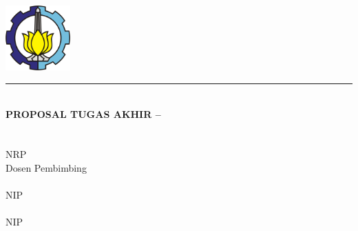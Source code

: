\begin{titlepage}


\vspace*{-1.5cm} %
\noindent
\includegraphics[width=2.5cm]{cover/logoITS.png} \\[1cm] 

\noindent\hspace*{-3cm}\textcolor{ITSBlue}{\rule{\paperwidth}{1cm}} \\[0.3cm]

\noindent
{\fontsize{14pt}{14pt}\selectfont \textbf{PROPOSAL TUGAS AKHIR – \kodeTA}} \\[2cm]

\noindent
{\fontsize{18pt}{14pt}\selectfont \textbf{\judulTA}} \\[2cm]

\noindent
{\fontsize{14pt}{14pt}\selectfont \textbf{\namaMhs} \\ NRP \nrpMhs} \\[2cm]

\noindent
{\fontsize{14pt}{14pt}\selectfont Dosen Pembimbing} \\[0.3cm]
\noindent
{\fontsize{14pt}{14pt}\selectfont \textbf{\pembimbingSatu} \\ NIP \nipPembimbingSatu} \\[0.8cm]
\noindent
{\fontsize{14pt}{14pt}\selectfont \textbf{\pembimbingDua} \\ NIP \nipPembimbingDua} \\[2cm]

\noindent
{\fontsize{12pt}{14pt}\selectfont \textbf{\prodi}} \\[0.3cm]
\noindent
{\fontsize{12pt}{14pt}\selectfont
\depart \\
\fakul \\
\kampus \\
\kota \\
\tahundibuat}

\normalfont

\end{titlepage}
